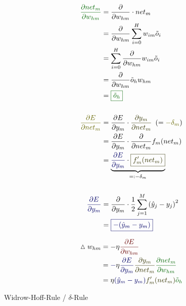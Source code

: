 \documentclass[10pt, a4paper]{article}
\begin{document}
\begin{itemize}
\begin{align*}
\textcolor{green}{\frac{\partial net_m }{ \partial w_{hm} }} &= \frac{ \partial }{ \partial w_{hm} } \cdot net_m \\
&= \frac{ \partial }{ \partial w_{hm} } \sum_{i=0}^H w_{im} \tilde{o}_i \\
&= \sum_{i=0}^H \frac{ \partial }{ \partial w_{hm} } w_{im} \tilde{o}_i \\
&= \frac{ \partial }{ \partial w_{hm} } \tilde{o}_h w_{hm} \\
&= \text{\textcolor{green}{\framebox{$ \tilde{o}_h $}}} \\
\\
\textcolor{magenta}{\frac{\partial E }{ \partial net_m }} &= \frac{ \partial E }{ \partial y_m } \cdot \textcolor{orange}{\frac{ \partial y_m }{ \partial net_m }} \ \left( = \textcolor{magenta}{- \delta_m} \right) \\
&= \frac{ \partial E }{ \partial y_m } \cdot \frac{ \partial }{ \partial net_m } f_m(net_m) \\
&= \underbrace{\textcolor{blue}{\frac{ \partial E }{ \partial y_m }} \cdot \text{\textcolor{orange}{\framebox{$ f'_m (net_m) $}}}}_{=: -\delta_m} \\
\\
\textcolor{blue}{\frac{ \partial E }{ \partial y_m }} &= \frac{ \partial }{ \partial y_m } \cdot \frac{1}{2} \sum_{j=1}^M \left( \hat{y}_j - y_j \right)^2 \\
&= \text{\textcolor{blue}{\framebox{$ - (\hat{y}_m - y_m) $}}} \\
\end{align*}

\begin{align*}
\vartriangle w_{hm} &= - \eta \textcolor{red}{\frac{ \partial E }{ \partial w_{hm} }} \\
&= \textcolor{blue}{-} \eta \textcolor{blue}{\frac{ \partial E }{ \partial y_m }} \textcolor{orange}{\frac{ \partial y_m}{ \partial net_m}} \textcolor{green}{\frac{ \partial net_m}{ \partial w_{hm}}} \\
&= \eta \textcolor{blue}{\left( \hat{y}_m - y_m \right)} \textcolor{orange}{f'_m(net_m)} \textcolor{green}{\tilde{o}_h}
\end{align*}


Widrow-Hoff-Rule / $\delta$-Rule
\\


\end{itemize}
\end{document}

